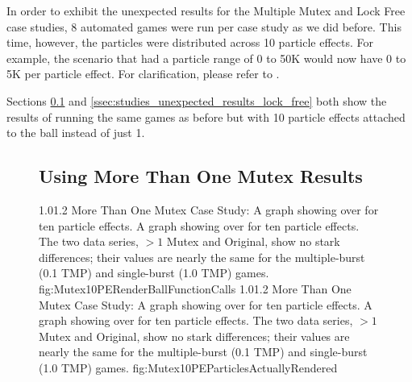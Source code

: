 In order to exhibit the unexpected results for the Multiple Mutex and Lock Free case studies,  8 automated games were run per case study as we did before. This time, however, the particles were distributed across 10 particle effects. For example, the scenario that had a particle range of 0 to 50K would now have 0 to 5K per particle effect. For clarification, please refer to .

Sections \ref{ssec:studies_unexpected_results_mutex} and \ref{ssec:studies_unexpected_results_lock_free} both show the results of running the same games as before but with 10 particle effects attached to the ball instead of just 1.

\begin{figure}
\addtocounter{figure}{-1}

\vspace{-1.5cm}
\subsection{Using More Than One Mutex Results}\label{ssec:studies_unexpected_results_mutex}
	\vspace{-0.5cm}
	{1.0}{1.2}
	{More Than One Mutex Case Study: A graph showing  over  for ten particle effects.}
	{A graph showing  over  for ten particle effects. The two data series, $ > 1 $ Mutex and Original, show no stark differences; their  values are nearly the same for the multiple-burst (0.1 TMP) and single-burst (1.0 TMP) games.}
	{fig:Mutex10PERenderBallFunctionCalls}
	\vspace{-1.5cm}
	{1.0}{1.2}
	{More Than One Mutex Case Study: A graph showing  over  for ten particle effects.}
	{A graph showing  over  for ten particle effects. The two data series, $ > 1 $ Mutex and Original, show no stark differences; their  values are nearly the same for the multiple-burst (0.1 TMP) and single-burst (1.0 TMP) games.}
	{fig:Mutex10PEParticlesActuallyRendered}

\end{figure}

